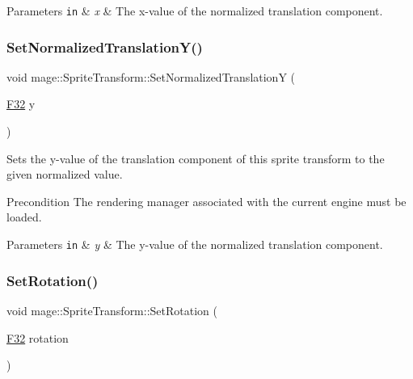 \begin{DoxyParams}[1]{Parameters}
\mbox{\tt in}  & {\em x} & The x-\/value of the normalized translation component. \\
\hline
\end{DoxyParams}
\hypertarget{classmage_1_1_sprite_transform_aac384e3769b23e4452e6dd7b416146fa}{}\label{classmage_1_1_sprite_transform_aac384e3769b23e4452e6dd7b416146fa} 
\subsubsection{\texorpdfstring{Set\+Normalized\+Translation\+Y()}{SetNormalizedTranslationY()}}
{\footnotesize\ttfamily void mage\+::\+Sprite\+Transform\+::\+Set\+Normalized\+TranslationY (\begin{DoxyParamCaption}\item[{\hyperlink{namespacemage_aa97e833b45f06d60a0a9c4fc22ae02c0}{F32}}]{y }\end{DoxyParamCaption})}

Sets the y-\/value of the translation component of this sprite transform to the given normalized value.

\begin{DoxyPrecond}{Precondition}
The rendering manager associated with the current engine must be loaded. 
\end{DoxyPrecond}

\begin{DoxyParams}[1]{Parameters}
\mbox{\tt in}  & {\em y} & The y-\/value of the normalized translation component. \\
\hline
\end{DoxyParams}
\hypertarget{classmage_1_1_sprite_transform_aa5e9162146729dd579e2409e348eafa2}{}\label{classmage_1_1_sprite_transform_aa5e9162146729dd579e2409e348eafa2} 
\subsubsection{\texorpdfstring{Set\+Rotation()}{SetRotation()}}
{\footnotesize\ttfamily void mage\+::\+Sprite\+Transform\+::\+Set\+Rotation (\begin{DoxyParamCaption}\item[{\hyperlink{namespacemage_aa97e833b45f06d60a0a9c4fc22ae02c0}{F32}}]{rotation }\end{DoxyParamCaption})\hspace{0.3cm}{\ttfamily [noexcept]}}

